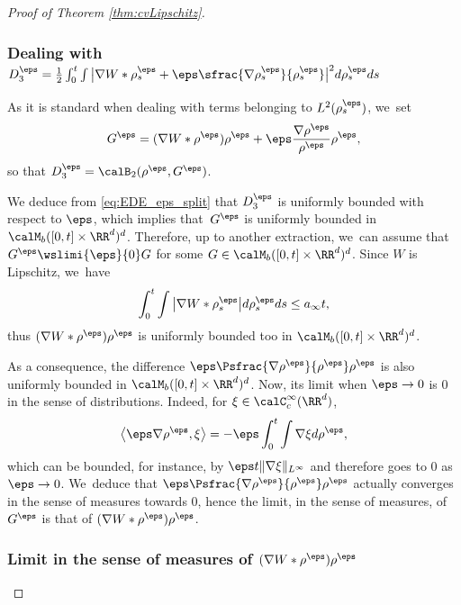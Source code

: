 \begin{proof}[Proof of Theorem \ref{thm:cvLipschitz}]
\subsubsection*{Dealing with $D_3^\eps = \frac 12 \int_0^t \int \big| \nabla W * \rho^\eps_s + \eps \sfrac{\nabla \rho^\eps_s}{\rho^\eps_s} \big|^2 d\rho^\eps_s ds$}

As it is standard when dealing with terms belonging to $L^2(\rho^\eps_s)$, we~set
\[
G^\eps = (\nabla W * \rho^\eps) \rho^\eps + \eps \frac{\nabla \rho^\eps}{\rho^\eps} \rho^\eps,
\]
so that $D_3^\eps = \calB_2(\rho^\eps, G^\eps)$.

We deduce from \eqref{eq:EDE_eps_split} that $D_3^\eps$ is uniformly bounded with respect to $\eps$, which implies that~$G^\eps$ is uniformly bounded in $\calM_b([0,t] \times \RR^d)^d$. Therefore, up to another extraction, we~can assume that $G^\eps \wslimi{\eps}{0} G$ for some $G \in \calM_b([0,t] \times \RR^d)^d$. Since $W$ is Lipschitz, we~have
\[
\int_0^t \int \big|\nabla W * \rho^\eps_s\big| d\rho^\eps_s ds \leq a_\infty t,
\]
thus $(\nabla W * \rho^\eps) \rho^\eps$ is uniformly bounded too in $\calM_b([0,t] \times \RR^d)^d$.

As a consequence, the difference $\eps \Psfrac{\nabla \rho^\eps}{\rho^\eps} \rho^\eps$ is also uniformly bounded in \hbox{$\calM_b([0,t] \times \RR^d)^d$}. Now, its limit when $\eps \to 0$ is 0 in the sense of distributions. Indeed, for $\xi \in \calC_c^\infty(\RR^d)$,
\[
\left\langle\eps \nabla \rho^\eps, \xi\right\rangle = - \eps \int_0^t \int \nabla \xi d\rho^\eps,
\]
which can be bounded, for instance, by $\eps t \|\nabla \xi\|_{L^\infty}$ and therefore goes to 0 as $\eps \to 0$. We~deduce that $\eps \Psfrac{\nabla \rho^\eps}{\rho^\eps} \rho^\eps$ actually converges in the sense of measures towards 0, hence the limit, in the sense of measures, of $G^\eps$ is that of $(\nabla W * \rho^\eps) \rho^\eps$.

\subsubsection*{Limit in the sense of measures of $(\nabla W * \rho^\eps) \rho^\eps$}


\end{proof}
